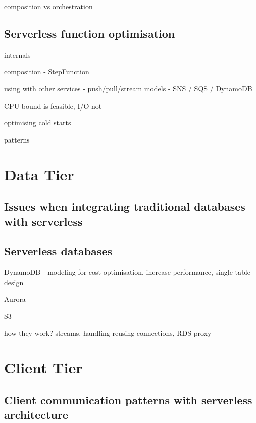 composition vs orchestration


\subsection{Serverless function optimisation}

internals

composition - StepFunction

using with other services - push/pull/stream models - SNS / SQS / DynamoDB

CPU bound is feasible, I/O not

optimising cold starts

patterns

\section{Data Tier}

\subsection{Issues when integrating traditional databases with serverless}

\subsection{Serverless databases}

DynamoDB - modeling for cost optimisation, increase performance, single table design

Aurora

S3

how they work? streams, handling reusing connections, RDS proxy

\section{Client Tier}

\subsection{Client communication patterns with serverless architecture}

